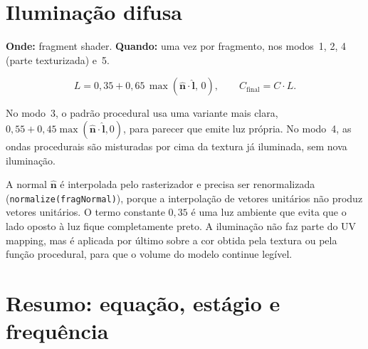 \section{Iluminação difusa}

\textbf{Onde:} fragment shader. \textbf{Quando:} uma vez por fragmento, nos modos~1, 2, 4 (parte texturizada) e~5.

\begin{equation}
L = 0{,}35 + 0{,}65\,\max(\hat{\mathbf{n}}\cdot\hat{\mathbf{l}},\,0),
\qquad C_{\text{final}} = C\cdot L.
\label{eq:lambert}
\end{equation}

No modo~3, o padrão procedural usa uma variante mais clara, \(0{,}55 + 0{,}45\max(\hat{\mathbf{n}}\cdot\hat{\mathbf{l}},0)\), para parecer que emite luz própria. No modo~4, as ondas procedurais são misturadas por cima da textura já iluminada, sem nova iluminação.

A normal \(\hat{\mathbf{n}}\) é interpolada pelo rasterizador e precisa ser renormalizada (\texttt{normalize(fragNormal)}), porque a interpolação de vetores unitários não produz vetores unitários. O termo constante \(0{,}35\) é uma luz ambiente que evita que o lado oposto à luz fique completamente preto. A iluminação não faz parte do UV mapping, mas é aplicada por último sobre a cor obtida pela textura ou pela função procedural, para que o volume do modelo continue legível.

\section{Resumo: equação, estágio e frequência}

